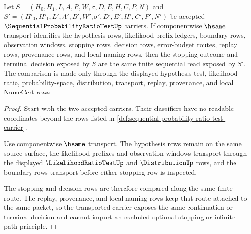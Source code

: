 \begin{theorem}
\label{thm:sequential-probability-ratio-test-stopping-ledger}
Let $S=(H_0,H_1,L,A,B,W,\sigma,D,E,H,C,P,N)$ and $S'=(H'_0,H'_1,L',A',B',W',\sigma',D',E',H',C',P',N')$ be accepted $\SequentialProbabilityRatioTestUp$ carriers. If componentwise $\hsame$ transport identifies the hypothesis rows, likelihood-prefix ledgers, boundary rows, observation windows, stopping rows, decision rows, error-budget routes, replay rows, provenance rows, and local naming rows, then the stopping outcome and terminal decision exposed by $S$ are the same finite sequential read exposed by $S'$. The comparison is made only through the displayed hypothesis-test, likelihood-ratio, probability-space, distribution, transport, replay, provenance, and local NameCert rows.
\end{theorem}
\begin{proof}
Start with the two accepted carriers. Their classifiers have no readable coordinates beyond the rows listed in \autoref{def:sequential-probability-ratio-test-carrier}.

Use componentwise $\hsame$ transport. The hypothesis rows remain on the same source surface, the likelihood prefixes and observation windows transport through the displayed $\LikelihoodRatioTestUp$ and $\DistributionUp$ rows, and the boundary rows transport before either stopping row is inspected.

The stopping and decision rows are therefore compared along the same finite route. The replay, provenance, and local naming rows keep that route attached to the same packet, so the transported carrier exposes the same continuation or terminal decision and cannot import an excluded optional-stopping or infinite-path principle.
\end{proof}

